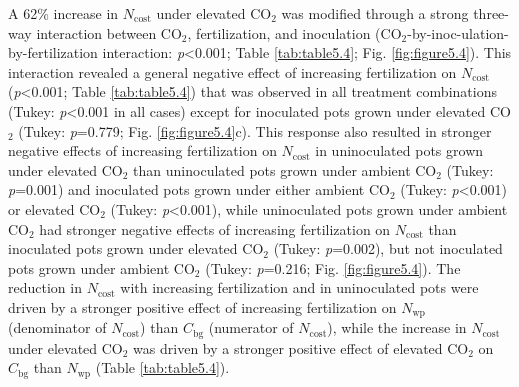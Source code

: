 A 62\% increase in $N_\mathrm{cost}$ under elevated CO$_2$ was modified through a strong three-way interaction between CO$_2$, fertilization, and inoculation (CO$_2$-by-inoc-ulation-by-fertilization interaction: \textit{p}<0.001; Table \ref{tab:table5.4}; Fig. \ref{fig:figure5.4}). This interaction revealed a general negative effect of increasing fertilization on $N_\mathrm{cost}$ (\textit{p}<0.001; Table \ref{tab:table5.4}) that was observed in all treatment combinations (Tukey: \textit{p}<0.001 in all cases) except for inoculated pots grown under elevated CO$_2$ (Tukey: \textit{p}=0.779; Fig. \ref{fig:figure5.4}c). This response also resulted in stronger negative effects of increasing fertilization on $N_\mathrm{cost}$ in uninoculated pots grown under elevated CO$_2$ than uninoculated pots grown under ambient CO$_2$ (Tukey: \textit{p}=0.001) and inoculated pots grown under either ambient CO$_2$ (Tukey: \textit{p}<0.001) or elevated CO$_2$ (Tukey: \textit{p}<0.001), while uninoculated pots grown under ambient CO$_2$ had stronger negative effects of increasing fertilization on $N_\mathrm{cost}$ than inoculated pots grown under elevated CO$_2$ (Tukey: \textit{p}=0.002), but not inoculated pots grown under ambient CO$_2$ (Tukey: \textit{p}=0.216; Fig. \ref{fig:figure5.4}). The reduction in $N_\mathrm{cost}$ with increasing fertilization and in uninoculated pots were driven by a stronger positive effect of increasing fertilization on $N_\mathrm{wp}$ (denominator of $N_\mathrm{cost}$) than $C_\mathrm{bg}$ (numerator of $N_\mathrm{cost}$), while the increase in $N_\mathrm{cost}$ under elevated CO$_2$ was driven by a stronger positive effect of elevated CO$_2$ on $C_\mathrm{bg}$ than $N_\mathrm{wp}$ (Table \ref{tab:table5.4}).

